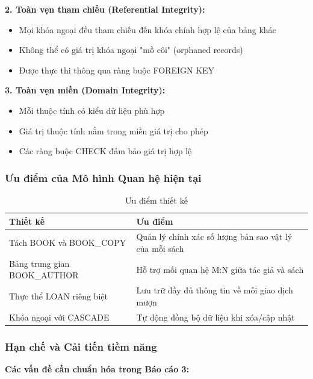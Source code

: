 \documentclass[12pt,a4paper]{article}
\begin{document}
\textbf{2. Toàn vẹn tham chiếu (Referential Integrity):}
\begin{itemize}
    \item Mọi khóa ngoại đều tham chiếu đến khóa chính hợp lệ của bảng khác
    \item Không thể có giá trị khóa ngoại "mồ côi" (orphaned records)
    \item Được thực thi thông qua ràng buộc FOREIGN KEY
\end{itemize}

\textbf{3. Toàn vẹn miền (Domain Integrity):}
\begin{itemize}
    \item Mỗi thuộc tính có kiểu dữ liệu phù hợp
    \item Giá trị thuộc tính nằm trong miền giá trị cho phép
    \item Các ràng buộc CHECK đảm bảo giá trị hợp lệ
\end{itemize}

\subsubsection{Ưu điểm của Mô hình Quan hệ hiện tại}

\begin{table}[H]
\centering
\caption{Ưu điểm thiết kế}
\begin{tabular}{@{}|l|p{10cm}|@{}}
\hline
\textbf{Thiết kế} & \textbf{Ưu điểm} \\ \hline
Tách BOOK và BOOK\_COPY & Quản lý chính xác số lượng bản sao vật lý của mỗi sách \\ \hline
Bảng trung gian BOOK\_AUTHOR & Hỗ trợ mối quan hệ M:N giữa tác giả và sách \\ \hline
Thực thể LOAN riêng biệt & Lưu trữ đầy đủ thông tin về mỗi giao dịch mượn \\ \hline
Khóa ngoại với CASCADE & Tự động đồng bộ dữ liệu khi xóa/cập nhật \\ \hline
\end{tabular}
\end{table}

\subsubsection{Hạn chế và Cải tiến tiềm năng}

\textbf{Các vấn đề cần chuẩn hóa trong Báo cáo 3:}
\end{document}
